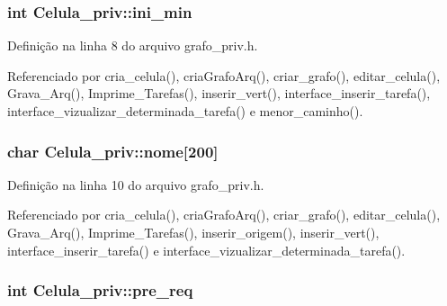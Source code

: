 \hypertarget{structCelula__priv_a3c49601fe078bd7bb1512f0107af5301}{}
\subsubsection[{ini\+\_\+min}]{\setlength{\rightskip}{0pt plus 5cm}int Celula\+\_\+priv\+::ini\+\_\+min}\label{structCelula__priv_a3c49601fe078bd7bb1512f0107af5301}


Definição na linha 8 do arquivo grafo\+\_\+priv.\+h.



Referenciado por cria\+\_\+celula(), cria\+Grafo\+Arq(), criar\+\_\+grafo(), editar\+\_\+celula(), Grava\+\_\+\+Arq(), Imprime\+\_\+\+Tarefas(), inserir\+\_\+vert(), interface\+\_\+inserir\+\_\+tarefa(), interface\+\_\+vizualizar\+\_\+determinada\+\_\+tarefa() e menor\+\_\+caminho().

\hypertarget{structCelula__priv_a7f33fa72aceed7b44922f0f39d6f7f59}{}
\subsubsection[{nome}]{\setlength{\rightskip}{0pt plus 5cm}char Celula\+\_\+priv\+::nome\mbox{[}200\mbox{]}}\label{structCelula__priv_a7f33fa72aceed7b44922f0f39d6f7f59}


Definição na linha 10 do arquivo grafo\+\_\+priv.\+h.



Referenciado por cria\+\_\+celula(), cria\+Grafo\+Arq(), criar\+\_\+grafo(), editar\+\_\+celula(), Grava\+\_\+\+Arq(), Imprime\+\_\+\+Tarefas(), inserir\+\_\+origem(), inserir\+\_\+vert(), interface\+\_\+inserir\+\_\+tarefa() e interface\+\_\+vizualizar\+\_\+determinada\+\_\+tarefa().

\hypertarget{structCelula__priv_a3ff8d3c4d0ba994771391320203619fc}{}
\subsubsection[{pre\+\_\+req}]{\setlength{\rightskip}{0pt plus 5cm}int Celula\+\_\+priv\+::pre\+\_\+req}\label{structCelula__priv_a3ff8d3c4d0ba994771391320203619fc}


